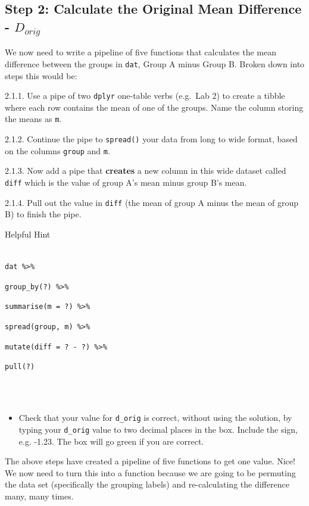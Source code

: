 \documentclass[]{book}
\providecommand{\tightlist}{%
  \setlength{\itemsep}{0pt}\setlength{\parskip}{0pt}}
\newenvironment{info}
    {
    \hline\\
    }
    { 
    \\\\\hline
    }
\begin{document}
\hypertarget{Ch5InClassQueT2}{%
\subsection{\texorpdfstring{Step 2: Calculate the Original Mean Difference - \(D_{orig}\)}{Step 2: Calculate the Original Mean Difference - D\_\{orig\}}}\label{Ch5InClassQueT2}}

We now need to write a pipeline of five functions that calculates the mean difference between the groups in \texttt{dat}, Group A minus Group B. Broken down into steps this would be:

2.1.1. Use a pipe of two \texttt{dplyr} one-table verbs (e.g.~Lab 2) to create a tibble where each row contains the mean of one of the groups. Name the column storing the means as \texttt{m}.

2.1.2. Continue the pipe to \texttt{spread()} your data from long to wide format, based on the columns \texttt{group} and \texttt{m}.

2.1.3. Now add a pipe that \textbf{creates} a new column in this wide dataset called \texttt{diff} which is the value of group A's mean minus group B's mean.

2.1.4. Pull out the value in \texttt{diff} (the mean of group A minus the mean of group B) to finish the pipe.

Helpful Hint

\begin{info}
\texttt{dat\ \%\textgreater{}\%}

\texttt{group\_by(?)\ \%\textgreater{}\%}

\texttt{summarise(m\ =\ ?)\ \%\textgreater{}\%}

\texttt{spread(group,\ m)\ \%\textgreater{}\%}

\texttt{mutate(diff\ =\ ?\ -\ ?)\ \%\textgreater{}\%}

\texttt{pull(?)}
\end{info}

\begin{itemize}
\tightlist
\item
  Check that your value for \texttt{d\_orig} is correct, without using the solution, by typing your \texttt{d\_orig} value to two decimal places in the box. Include the sign, e.g. -1.23. The box will go green if you are correct. 
\end{itemize}

The above steps have created a pipeline of five functions to get one value. Nice! We now need to turn this into a function because we are going to be permuting the data set (specifically the grouping labels) and re-calculating the difference many, many times.
\end{document}
